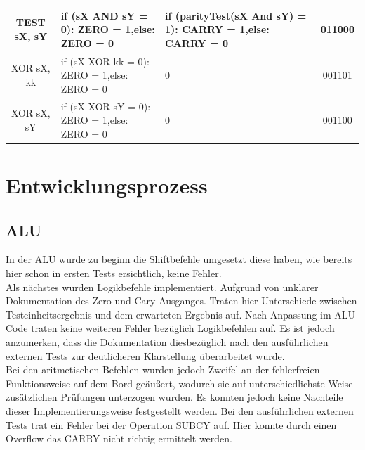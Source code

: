 \documentclass{scrartcl}
\begin{document}
\begin{longtable}{||c|p{6cm}|p{6cm}|c||}
    TEST sX, sY  & if (sX AND sY = 0): ZERO = 1,\newline else: ZERO = 0
    & if (parityTest\footnotemark[1](sX And sY) = 1): CARRY = 1,\newline else: CARRY = 0 & 011000 \\ \hline
    XOR sX, kk & if (sX XOR kk = 0): ZERO = 1,\newline else: ZERO = 0 & 0 & 001101 \\ \hline
    XOR sX, sY & if (sX XOR sY = 0): ZERO = 1,\newline else: ZERO = 0 & 0 & 001100 \\ \hline
\end{longtable}
\label{tab:1}
\newpage
\section{Entwicklungsprozess}\label{sec:Entwicklungsprozess}%

\subsection{ALU}
In der ALU wurde zu beginn die Shiftbefehle umgesetzt diese haben, wie bereits hier schon in ersten Tests ersichtlich, keine Fehler. \\
Als nächstes wurden Logikbefehle implementiert. Aufgrund von unklarer Dokumentation des Zero und Cary Ausganges. Traten hier Unterschiede zwischen Testeinheitsergebnis und dem erwarteten Ergebnis auf. Nach Anpassung im ALU Code traten keine weiteren Fehler bezüglich Logikbefehlen auf. Es ist jedoch anzumerken, dass die Dokumentation diesbezüglich nach den ausführlichen externen Tests zur deutlicheren Klarstellung überarbeitet wurde. \\
Bei den aritmetischen Befehlen wurden jedoch Zweifel an der fehlerfreien Funktionsweise auf dem Bord geäußert, wodurch sie auf unterschiedlichste Weise zusätzlichen Prüfungen unterzogen wurden. Es konnten jedoch keine Nachteile dieser Implementierungsweise festgestellt werden. Bei den ausführlichen externen Tests trat ein Fehler bei der Operation SUBCY auf. Hier konnte durch einen Overflow das CARRY nicht richtig ermittelt werden.\\
\end{document}
